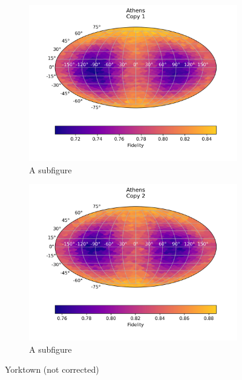 \begin{figure}[H]
    \centering
    \begin{subfigure}{.5\textwidth}
      \centering
      \includegraphics[width=\textwidth]{Figures/PhaseCovariant/IBM/FullSphere/results_athens.txt_copy1.png}
      \caption{A subfigure}
      \label{fig:pc_athens_sphere_1}
    \end{subfigure}%
    \begin{subfigure}{.5\textwidth}
      \centering
      \includegraphics[width=\textwidth]{Figures/PhaseCovariant/IBM/FullSphere/results_athens.txt_copy2.png}
      \caption{A subfigure}
      \label{fig:pc_athens_sphere_2}
    \end{subfigure}
    \caption{Yorktown (not corrected)}
    \label{fig:pc_athens_sphere}
\end{figure}

